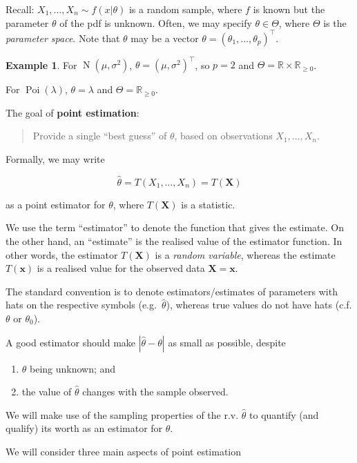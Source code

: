 \documentclass[
]{book}
\newcommand{\bx}{{\boldsymbol x}}
\newcommand{\bX}{{\boldsymbol X}}
\DeclareMathOperator{\N}{N}
\DeclareMathOperator{\Pois}{Poi}
\newcommand{\bbR}{\mathbb{R}}
\theoremstyle{definition}
\theoremstyle{definition}
\newtheorem{example}{Example}[chapter]
\theoremstyle{definition}
\theoremstyle{definition}
\theoremstyle{remark}
\begin{document}
Recall: \(X_1,\dots,X_n\sim f(x|\theta)\) is a random sample, where \(f\) is known but the parameter \(\theta\) of the pdf is unknown. Often, we may specify \(\theta\in\Theta\), where \(\Theta\) is the \emph{parameter space}.
Note that \(\theta\) may be a vector \(\theta=(\theta_1,\dots,\theta_p)^\top\).

\begin{example}
For \(\N(\mu,\sigma^2)\), \(\theta = (\mu,\sigma^2)^\top\), so \(p=2\) and \(\Theta = \bbR \times \bbR_{\geq 0}\).

For \(\Pois(\lambda)\), \(\theta=\lambda\) and \(\Theta=\bbR_{\geq 0}\).
\end{example}

The goal of \textbf{point estimation}:

\begin{quote}
Provide a single ``best guess'' of \(\theta\), based on observations \(X_1,\dots,X_n\).
\end{quote}

Formally, we may write

\[
\hat\theta = T(X_1,\dots,X_n) = T(\bX)
\]

as a point estimator for \(\theta\), where \(T(\bX)\) is a statistic.

We use the term ``estimator'' to denote the function that gives the estimate.
On the other hand, an ``estimate'' is the realised value of the estimator function.
In other words, the estimator \(T(\bX)\) is a \emph{random variable}, whereas the estimate \(T(\bx)\) is a realised value for the observed data \(\bX=\bx\).

The standard convention is to denote estimators/estimates of parameters with hats on the respective symbols (e.g.~\(\hat\theta\)), whereas true values do not have hats (c.f.
\(\theta\) or \(\theta_0\)).

A good estimator should make \(|\hat\theta-\theta|\) as small as possible, despite

\begin{enumerate}
\def\labelenumi{\roman{enumi}.}
\item
  \(\theta\) being unknown; and
\item
  the value of \(\hat\theta\) changes with the sample observed.
\end{enumerate}

We will make use of the sampling properties of the r.v. \(\hat\theta\) to quantify (and qualify) its worth as an estimator for \(\theta\).

We will consider three main aspects of point estimation
\end{document}
